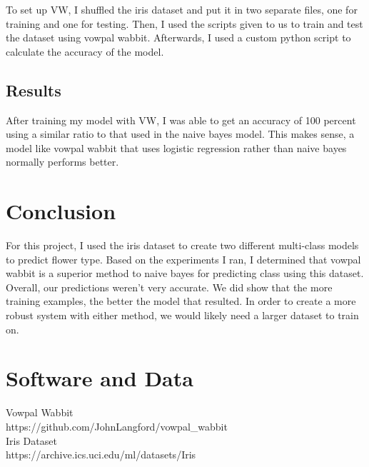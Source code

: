 \documentclass{article}
\begin{document}
To set up VW, I shuffled the iris dataset and put it in two separate files, one for training and one for testing. Then, I used the scripts given to us to train and test the dataset using vowpal wabbit. Afterwards, I used a custom python script to calculate the accuracy of the model.


\subsection{Results}

After training my model with VW, I was able to get an accuracy of 100 percent using a similar ratio to that used in the naive bayes model. This makes sense, a model like vowpal wabbit that uses logistic regression rather than naive bayes normally performs better.

\section{Conclusion}

For this project, I used the iris dataset to create two different multi-class models to predict flower type. Based on the experiments I ran, I determined that vowpal wabbit is a superior method to naive bayes for predicting class using this dataset. Overall, our predictions weren't very accurate. We did show that the more training examples, the better the model that resulted. In order to create a more robust system with either method, we would likely need a larger dataset to train on. 


\section{Software and Data}

Vowpal Wabbit\\ https://github.com/JohnLangford/vowpal_wabbit\\
Iris Dataset\\ https://archive.ics.uci.edu/ml/datasets/Iris\\


\nocite{langley00}
\end{document}
